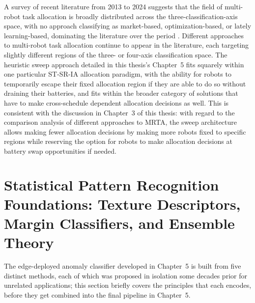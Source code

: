 A survey of recent literature from 2013 to 2024 suggests that the field of multi-robot task allocation is broadly distributed across the three-classification-axis space, with no approach classifying as market-based, optimization-based, or lately learning-based, dominating the literature over the period \cite{athira2024systematic}. Different approaches to multi-robot task allocation continue to appear in the literature, each targeting slightly different regions of the three- or four-axis classification space. The heuristic sweep approach detailed in this thesis's Chapter~5 fits squarely within one particular ST-SR-IA allocation paradigm, with the ability for robots to temporarily escape their fixed allocation region if they are able to do so without draining their batteries, and fits within the broader category of solutions that have to make cross-schedule dependent allocation decisions as well. This is consistent with the discussion in Chapter~3 of this thesis: with regard to the comparison analysis of different approaches to MRTA, the sweep architecture allows making fewer allocation decisions by making more robots fixed to specific regions while reserving the option for robots to make allocation decisions at battery swap opportunities if needed.

\section{Statistical Pattern Recognition Foundations: Texture Descriptors, Margin Classifiers, and Ensemble Theory}

The edge-deployed anomaly classifier developed in Chapter~5 is built from five distinct methods, each of which was proposed in isolation some decades prior for unrelated applications; this section briefly covers the principles that each encodes, before they get combined into the final pipeline in Chapter~5.

